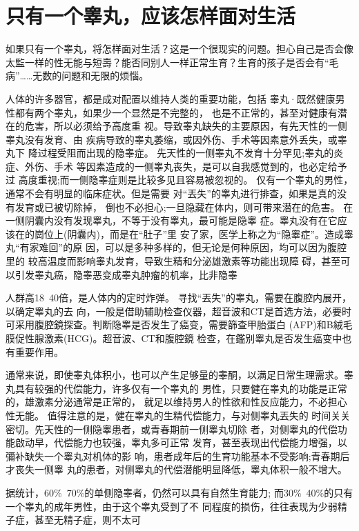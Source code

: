 \documentclass[12pt,UTF8]{ctexbook}
\begin{document}
\section{只有一个睾丸，应该怎样面对生活}

如果只有一个睾丸，将怎样面对生活？这是一个很现实的问题。担心自己是否会像太監一样的性无能与短壽？能否同别人一样正常生育？生育的孩子是否会有“毛病”……无数的问题和无限的烦惱。

人体的许多器官，都是成对配置以维持人类的重要功能，包括
睾丸·既然健康男性都有两个睾丸，如果少一个显然是不完整的，
也是不正常的，甚至对健康有潜在的危害，所以必须给予高度重
视。导致睾丸缺失的主要原因，有先天性的一侧睾丸没有发育、由
疾病导致的睾丸萎缩，或因外伤、手术等因素意外丢失，或睾丸下
降过程受阻而出现的隐睾症。
先天性的一侧睾丸不发育十分罕见;睾丸的炎症、外伤、手术
等因素造成的一侧睾丸丧失，是可以自我感觉到的，也必定给予过
高度重视;而一侧隐睾症则是比较多见且容易被忽视的。
仅有一个睾丸的男性，通常不会有明显的临床症状。但是需要
对“丟失”的睾丸进行排查，如果是真的没有发育或已被切除掉，
倒也不必担心;一旦隐藏在体内，则可带来潜在的危害。
在一侧阴囊内没有发现睾丸，不等于没有睾丸，最可能是隐睾
症。睾丸没有在它应该在的崗位上(阴囊内)，而是在“肚子”里
安了家，医学上称之为“隐睾症”。造成睾丸“有家难回”的原
因，可以是多种多样的，但无论是何种原因，均可以因为腹腔里的
较高温度而影响睾丸发育，导致生精和分泌雄激素等功能出现障
碍，甚至可以引发睾丸癌，隐睾恶变成睾丸肿瘤的机率，比非隐睾

人群高18~40倍，是人体内的定时炸弹。
寻找“丟失”的睾丸，需要在腹腔内展开，以确定睾丸的去
向，一般是借助辅助检查仪器，超音波和CT是首选方法，必要时
可采用腹腔鏡探查。判断隐睾是否发生了癌变，需要篩查甲胎蛋白
(AFP)和B絨毛膜促性腺激素(HCG)。超音波、CT和腹腔鏡
检查，在鑑别睾丸是否发生癌变中也有重要作用。

通常来说，即使睾丸体积小，也可以产生足够量的睾酮，以满足日常生理需求。睾丸具有较强的代偿能力，许多仅有一个睾丸的
男性，只要健在睾丸的功能是正常的，雄激素分泌通常是正常的，
就足以维持男人的性欲和性反应能力，不必担心性无能。
值得注意的是，健在睾丸的生精代偿能力，与对侧睾丸丟失的
时间关关密切。先天性的一侧隐睾患者，或青春期前一侧睾丸切除
者，对侧睾丸的代偿功能啟动早，代偿能力也较强，睾丸多可正常
发育，甚至表现出代偿能力增强，以彌补缺失一个睾丸对机体的影
响，患者成年后的生育功能基本不受影响;青春期后才丧失一侧睾
丸的患者，对侧睾丸的代偿潜能明显降低，睾丸体积一般不增大。

据统计，60\%~70\%的单侧隐睾者，仍然可以具有自然生育能力;
而30\%~40\%的只有一个睾丸的成年男性，由于这个睾丸受到了不
同程度的损伤，往往表现为少弱精子症，甚至无精子症，则不太可
\end{document}
